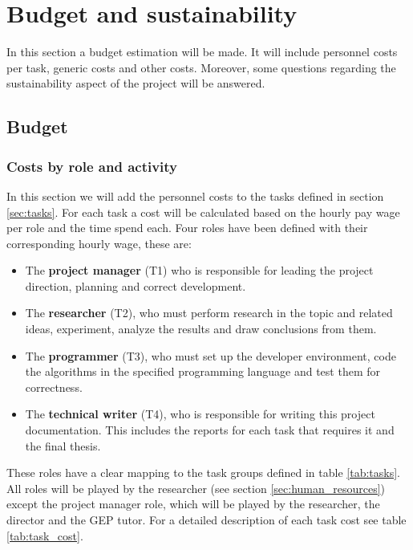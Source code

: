 
\chapter{Budget and sustainability} %
\label{Chapter3}

In this section a budget estimation will be made. It will include personnel costs per task, generic costs and other costs. Moreover, some questions regarding the sustainability aspect of the project will be answered.

\section{Budget}
\label{sec:budget}

\subsection{Costs by role and activity}

In this section we will add the personnel costs to the tasks defined in section \ref{sec:tasks}. For each task a cost will be calculated based on the hourly pay wage per role and the time spend each. Four roles have been defined with their corresponding hourly wage, these are:

\begin{itemize}
    \item The \textbf{project manager} (T1) who is responsible for leading the project direction, planning and correct development.
    \item The \textbf{researcher} (T2), who must perform research in the topic and related ideas, experiment, analyze the results and draw conclusions from them.
    \item The \textbf{programmer} (T3), who must set up the developer environment, code the algorithms in the specified programming language and test them for cor\-rect\-ness.
    \item The \textbf{technical writer} (T4), who is responsible for writing this project doc\-u\-men\-ta\-tion. This includes the reports for each task that requires it and the final thesis.
\end{itemize}

These roles have a clear mapping to the task groups defined in table \ref{tab:tasks}. All roles will be played by the researcher (see section \ref{sec:human_resources}) except the project manager role, which will be played by the researcher, the director and the GEP tutor. For a detailed description of each task cost see table \ref{tab:task_cost}.


